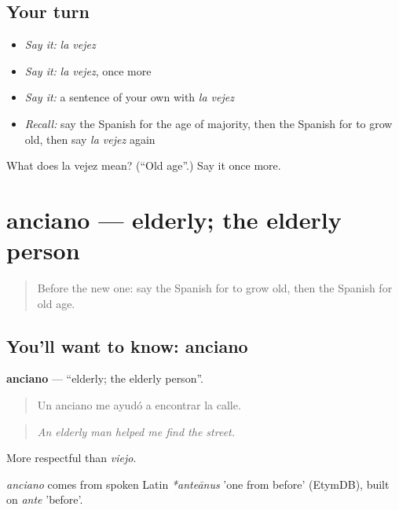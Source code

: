 \subsection*{Your turn}
\begin{itemize}
\raggedright
  \item \emph{Say it:} \emph{la vejez}
  \item \emph{Say it:} \emph{la vejez}, once more
  \item \emph{Say it:} a sentence of your own with \emph{la vejez}
  \item \emph{Recall:} say the Spanish for the age of majority, then the Spanish for to grow old, then say \emph{la vejez} again
\end{itemize}

\begin{tcolorbox}[breakable,colback=teal!4,colframe=teal!35!black,title={Before you move on}]
What does la vejez mean? (\textquotedblleft{}Old age\textquotedblright{}.) Say it once more.
\end{tcolorbox}
\section[anciano]{anciano — elderly; the elderly person}

\label{lesson:ES-C555-anciano}



\begin{quote}
Before the new one: say the Spanish for to grow old, then the Spanish for old age.
\end{quote}

\subsection*{You'll want to know: anciano}
\textbf{anciano} — \textquotedblleft{}elderly; the elderly person\textquotedblright{}.

\begin{quote}
Un anciano me ayudó a encontrar la calle.
\end{quote}

\begin{quote}
\emph{An elderly man helped me find the street.}
\end{quote}

More respectful than \emph{viejo}.

\begin{cousinweb}
\emph{anciano} comes from spoken Latin \emph{*anteānus} 'one from before' (EtymDB), built on \emph{ante} 'before'.
\end{cousinweb}

